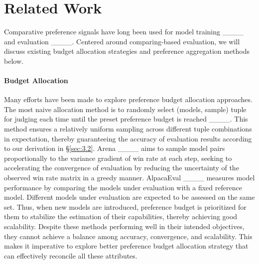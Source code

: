 \section{Related Work}
Comparative preference signals have long been used for model training ____ and evaluation ____.
Centered around comparing-based evaluation, we will discuss existing budget allocation strategies and preference aggregation methods below.
\paragraph{Budget Allocation}
\label{sec:2.1}
Many efforts have been made to explore preference budget allocation approaches.
The most naive allocation method is to randomly select (models, sample) tuple for judging each time until the preset preference budget is reached ____. 
This method ensures a relatively uniform sampling across different tuple combinations in expectation, thereby guaranteeing the accuracy of evaluation results according to our derivation in \S\ref{sec:3.2}.
Arena ____ aims to sample model pairs proportionally to the variance gradient of win rate at each step, seeking to accelerating the convergence of evaluation by reducing the uncertainty of the observed win rate matrix in a greedy manner. 
AlpacaEval ____ measures model performance by comparing the models under evaluation with a fixed reference model. Different models under evaluation are expected to be assessed on the same set. Thus, when new models are introduced, preference budget is prioritized for them to stabilize the estimation of their capabilities, thereby achieving good scalability.
Despite these methods performing well in their intended objectives, they cannot achieve a balance among accuracy, convergence, and scalability. This makes it imperative to explore better preference budget allocation strategy that can effectively reconcile all these attributes.

